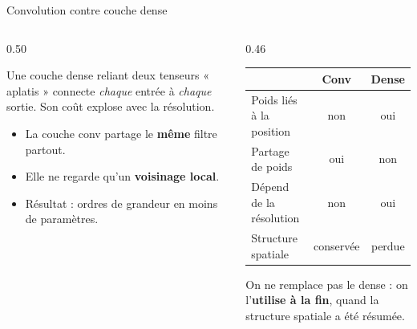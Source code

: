 \begin{frame}{Convolution contre couche dense}
\begin{columns}[t]
\begin{column}{0.50\textwidth}
\begin{wbox}
Une couche dense reliant deux tenseurs « aplatis » connecte \emph{chaque}
entrée à \emph{chaque} sortie. Son coût explose avec la résolution.
\end{wbox}
\begin{itemize}
  \item La couche conv partage le \textbf{même} filtre partout.
  \item Elle ne regarde qu'un \textbf{voisinage local}.
  \item Résultat : ordres de grandeur en moins de paramètres.
\end{itemize}
\end{column}
\begin{column}{0.46\textwidth}
\begin{center}
\begin{tabular}{@{}lcc@{}}
\toprule
& \textbf{Conv} & \textbf{Dense} \\
\midrule
Poids liés à la position & non & oui \\
Partage de poids & oui & non \\
Dépend de la résolution & non & oui \\
Structure spatiale & conservée & perdue \\
\bottomrule
\end{tabular}
\end{center}
\begin{kbox}
On ne remplace pas le dense : on l'\textbf{utilise à la fin}, quand la
structure spatiale a été résumée.
\end{kbox}
\end{column}
\end{columns}
\end{frame}

